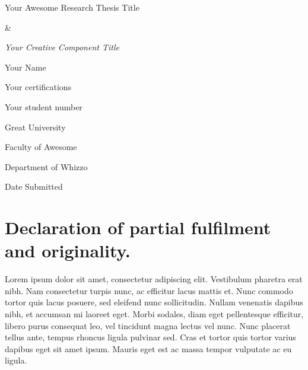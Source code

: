 \documentclass[a4paper]{memoir}
\begin{document}
\frontmatter

\vspace*{2.5cm}
\begin{center}
    \huge{Your Awesome Research Thesis Title}

    \huge{\&}

    \emph{\huge{Your Creative Component Title}}


\vspace{2.5cm}
    \Large{Your Name}

    \normalsize{Your certifications}

    Your student number

\vspace{2cm}
    \Large{Great University}

    \normalsize{Faculty of Awesome}

    Department of Whizzo

    Date Submitted


\end{center}


\pagebreak




\chapter*{Declaration of partial fulfilment and originality.}
\label{declarationofpartialfulfilmentandoriginality.}

Lorem ipsum dolor sit amet, consectetur adipiscing elit. Vestibulum pharetra erat nibh. Nam consectetur turpis nunc, ac efficitur lacus mattis et. Nunc commodo tortor quis lacus posuere, sed eleifend nunc sollicitudin. Nullam venenatis dapibus nibh, et accumsan mi laoreet eget. Morbi sodales, diam eget pellentesque efficitur, libero purus consequat leo, vel tincidunt magna lectus vel nunc. Nunc placerat tellus ante, tempus rhoncus ligula pulvinar sed. Cras et tortor quis tortor varius dapibus eget sit amet ipsum. Mauris eget est ac massa tempor vulputate ac eu ligula. 
\end{document}
